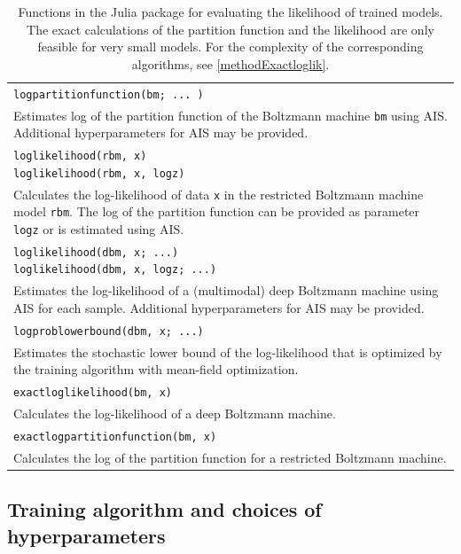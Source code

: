 \documentclass[12pt]{article}
\newcommand{\inlinecode}[1]{\texttt{#1}}
\begin{document}
\begin{table}
   \begin{tabularx}{\textwidth}{X}
   \hline
   \inlinecode{logpartitionfunction(bm; ... )} \\
   Estimates log of the partition function of the Boltzmann machine \inlinecode{bm} using AIS. Additional hyperparameters for AIS may be provided. \\
   \makecell[tl]{
      \inlinecode{loglikelihood(rbm, x)} \\
      \inlinecode{loglikelihood(rbm, x, logz)}
   } \\
   Calculates the log-likelihood of data \inlinecode{x} in the restricted Boltzmann machine model \inlinecode{rbm}. The log of the partition function can be provided as parameter \inlinecode{logz} or is estimated using AIS. \\
   \makecell[tl]{
      \inlinecode{loglikelihood(dbm, x; ...)} \\
      \inlinecode{loglikelihood(dbm, x, logz; ...)}
   } \\
   Estimates the log-likelihood of a (multimodal) deep Boltzmann machine using AIS for each sample. Additional hyperparameters for AIS may be provided. \\
   \inlinecode{logproblowerbound(dbm, x; ...)} \\
   Estimates the stochastic lower bound of the log-likelihood that is optimized by the training algorithm with mean-field optimization. \\
   \inlinecode{exactloglikelihood(bm, x)} \\
   Calculates the log-likelihood of a deep Boltzmann machine. \\
   \inlinecode{exactlogpartitionfunction(bm, x)} \\
   Calculates the log of the partition function for a restricted Boltzmann machine. \\
   \hline
\end{tabularx}
\caption{Functions in the Julia package for evaluating the likelihood of trained models. The exact calculations of the partition function and the likelihood are only feasible for very small models. For the complexity of the corresponding algorithms, see \ref{methodExactloglik}.}
\label{juliaFunTableEval}
\end{table}

\FloatBarrier
\subsection{Training algorithm and choices of hyperparameters}
\end{document}

